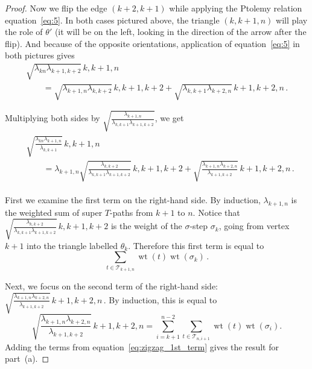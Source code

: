 \documentclass[pdftex]{sigma}
\numberwithin{equation}{section}
\DeclareMathOperator{\wt}{wt}
\begin{document}
\begin{proof}
 Now we flip the edge $(k+2, k+1)$ while applying the Ptolemy relation equation~\eqref{eq:5}. In both cases pictured above, the triangle $(k,k+1,n)$ will play
 the role of $\theta'$ (it will be on the left, looking in the direction of the arrow after the flip).
 And because of the opposite orientations, application of equation~\eqref{eq:5} in both pictures gives
 \begin{gather*}
 \sqrt{\lambda_{kn} \lambda_{k+1,k+2}} \, \boxed{k,k+1,n} \\
 \qquad{} = \sqrt{\lambda_{k+1,n} \lambda_{k,k+2}} \, \boxed{k,k+1,k+2} + \sqrt{\lambda_{k,k+1} \lambda_{k+2,n}} \, \boxed{k+1,k+2,n}\,.
 \end{gather*}


 Multiplying both sides by $\sqrt{\frac{\lambda_{k+1,n}}{\lambda_{k,k+1}\lambda_{k+1,k+2}}}$, we get
 \begin{gather*}
 \begin{split}
 & \sqrt{\frac{\lambda_{kn} \lambda_{k+1,n}}{\lambda_{k,k+1}}} \, \boxed{k,k+1,n}\\
& \qquad{}
 = \lambda_{k+1,n} \sqrt{\frac{\lambda_{k,k+2}}{\lambda_{k,k+1}\lambda_{k+1,k+2}}} \, \boxed{k,k+1,k+2}
 + \sqrt{\frac{\lambda_{k+1,n} \lambda_{k+2,n}}{\lambda_{k+1,k+2}}} \, \boxed{k+1,k+2,n}\,.
 \end{split}
 \end{gather*}


 First we examine the first term on the right-hand side. By induction, $\lambda_{k+1,n}$ is the weighted sum of super $T$-paths from $k+1$ to $n$.
 Notice that $\sqrt{\frac{\lambda_{k,k+2}}{\lambda_{k,k+1} \lambda_{k+1,k+2}}} \, \boxed{k,k+1,k+2}$ is the weight of the $\sigma$-step $\sigma_k$, going from
 vertex $k+1$ into the triangle labelled $\theta_k$.
 Therefore this first term is equal to
 \begin{equation} \label{eq:zigzag_1st_term}
 \sum_{t \in \mathcal{T}_{k+1,n}} \wt(t) \wt(\sigma_k)\,.
 \end{equation}

Next, we focus on the second term of the right-hand side: $\sqrt{\frac{\lambda_{k+1,n} \lambda_{k+2,n}}{\lambda_{k+1,k+2}}} \, \boxed{k+1,k+2,n}\,$.
 By induction, this is equal to
 \begin{equation*} %
 \sqrt{\frac{\lambda_{k+1,n} \lambda_{k+2,n}}{\lambda_{k+1,k+2}}} \, \boxed{k+1,k+2,n} = \sum_{i=k+1}^{n-2} \sum_{t \in \mathcal T_{n,i+1}} \wt(t) \wt(\sigma_i).
 \end{equation*}
 Adding the terms from equation~\eqref{eq:zigzag_1st_term} gives the result for part~(a).


\end{proof}
\end{document}
